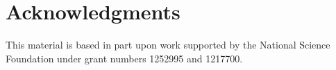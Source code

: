 \documentclass{sig-alternate}
\begin{document}







\section{Acknowledgments}

This material is based in part upon work supported by the National Science Foundation under grant numbers 1252995 and 1217700.


%


%
%

\end{document}
